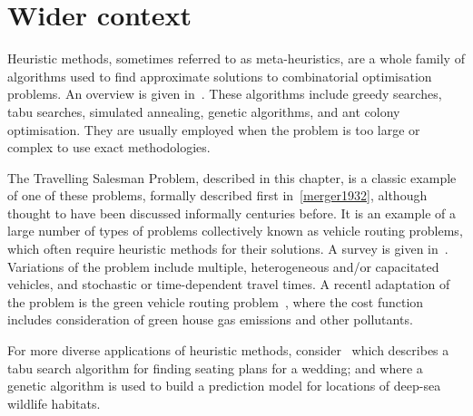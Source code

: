 \section{Wider context}\label{sec:heuristics_wider_context}

Heuristic methods, sometimes referred to as meta-heuristics, are a whole family
of algorithms used to find approximate solutions to combinatorial optimisation
problems. An overview is given in~\parencite{bozorg2017meta}. These algorithms
include greedy searches, tabu searches, simulated annealing, genetic algorithms,
and ant colony optimisation. They are usually employed when the problem is too
large or complex to use exact methodologies.

The Travelling Salesman Problem, described in this chapter, is a classic example
of one of these problems, formally described first in~\ref{merger1932}, although
thought to have been discussed informally centuries before.
It is an example of a large number of types of problems collectively known as
vehicle routing problems, which often require heuristic methods for their
solutions. A survey is given in~\parencite{braekers2016vehicle}. Variations of
the problem include multiple, heterogeneous and/or capacitated vehicles, and
stochastic or time-dependent travel times. A recentl adaptation of the problem
is the green vehicle routing problem~\parencite{moghdani2021green}, where the
cost function includes consideration of green house gas emissions and other
pollutants.

For more diverse applications of heuristic methods,
consider~\parencite{lewis2016creating} which describes a tabu search algorithm
for finding seating plans for a wedding; and \parencite{tong2013modeling} where
a genetic algorithm is used to build a prediction model for locations of
deep-sea wildlife habitats.
